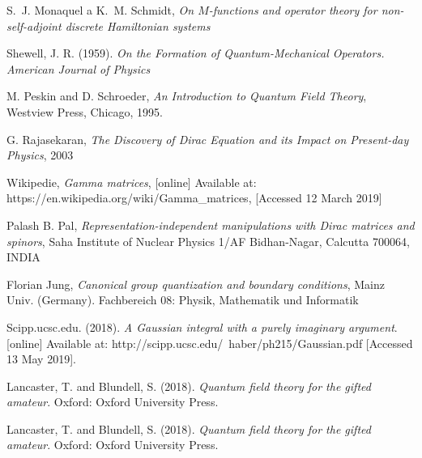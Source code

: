 \begin{thebibliography}{10}

    S.~J. Monaquel a K.~M. Schmidt, \textit{On $M$-functions and operator
      theory for non-self-adjoint discrete Hamiltonian systems}

        Shewell, J. R. (1959). \textit{On the Formation of Quantum-Mechanical 
        Operators. American Journal of Physics}

        M. Peskin and D. Schroeder, \textit{An Introduction to Quantum Field Theory},
        Westview Press, Chicago, 1995.

        G. Rajasekaran, \textit{The Discovery of Dirac Equation and its Impact on Present-day Physics},
        2003

        Wikipedie, \textit{Gamma matrices},
        [online] Available at: https://en.wikipedia.org/wiki/Gamma\_matrices, [Accessed 12 March 2019]

        Palash B. Pal, \textit{Representation-independent manipulations with Dirac matrices and spinors},
        Saha Institute of Nuclear Physics 1/AF Bidhan-Nagar, Calcutta 700064, INDIA

        Florian Jung, \textit{Canonical group quantization and boundary conditions},
        Mainz Univ. (Germany). Fachbereich 08: Physik, Mathematik und Informatik

        Scipp.ucsc.edu. (2018). \textit{A Gaussian integral with a purely imaginary argument}. 
        [online] Available at: http://scipp.ucsc.edu/~haber/ph215/Gaussian.pdf [Accessed 13 May 2019].

        Lancaster, T. and Blundell, S. (2018). \textit{Quantum field theory for the gifted amateur}. 
        Oxford: Oxford University Press.

        Lancaster, T. and Blundell, S. (2018). \textit{Quantum field theory for the gifted amateur}. 
        Oxford: Oxford University Press.
\end{thebibliography}

\cleardoublepage
